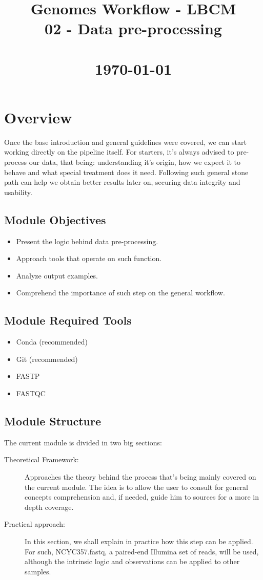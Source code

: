 \documentclass[a4paper,11pt]{article}
\title{
    \vfill
    \textcolor{noteblue}{\Huge Genomes Workflow - LBCM}\\
    \vspace{5.0cm}
    \textcolor{sidenotegray}{\huge 02 - Data pre-processing}\\
    \vspace{1.5cm}
    \textcolor{sidenotegray}{\LARGE }\\
    \vspace{5.0cm}
    \textcolor{sidenotegray}{\large \today}
    \vfill
}
\author{}
\date{}
\begin{document}
\maketitle
\thispagestyle{empty}
\newpage
\tableofcontents
\newpage
\section{Overview}
Once the base introduction and general guidelines were covered, we can start
working directly on the pipeline itself. For starters, it's always advised to
pre-process our data, that being: understanding it's origin, how we expect it to
behave and what special treatment does it need. Following such general stone
path can help we obtain better results later on, securing data integrity and
usability.
\subsection{Module Objectives}
\begin{itemize}
    \item Present the logic behind data pre-processing.
    \item Approach tools that operate on such function.
    \item Analyze output examples.
    \item Comprehend the importance of such step on the general workflow.
\end{itemize}
\subsection{Module Required Tools}
\begin{itemize}
    \item Conda (recommended)
    \item Git (recommended)
    \item FASTP
    \item FASTQC
\end{itemize}
\subsection{Module Structure}
The current module is divided in two big sections:
\begin{description}
    \item[Theoretical Framework:] Approaches the theory behind the process
        that's being mainly covered on the current module. The idea is to allow
        the user to consult for general concepts comprehension and, if needed,
        guide him to sources for a more in depth coverage.
    \item [Practical approach:] In this section, we shall explain in practice
        how this step can be applied. For such, NCYC357.fastq, a paired-end
        Illumina set of reads, will be used, although the intrinsic logic and
        observations can be applied to other samples.
\end{description}
\end{document}

